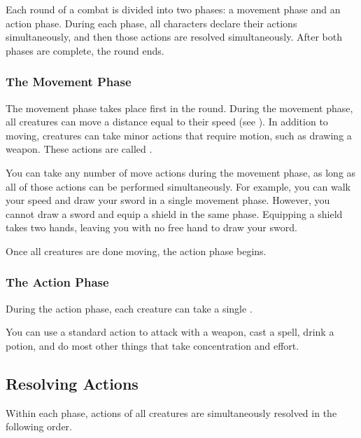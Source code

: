 Each round of a combat is divided into two phases: a movement phase and an action phase.
During each phase, all characters declare their actions simultaneously, and then those actions are resolved simultaneously.
After both phases are complete, the round ends.

\subsubsection{The Movement Phase}\label{The Movement Phase}

The movement phase takes place first in the round.
During the movement phase, all creatures can move a distance equal to their speed (see ).
In addition to moving, creatures can take minor actions that require motion, such as drawing a weapon.
These actions are called .

You can take any number of move actions during the movement phase, as long as all of those actions can be performed simultaneously.
For example, you can walk your speed and draw your sword in a single movement phase.
However, you cannot draw a sword and equip a shield in the same phase.
Equipping a shield takes two hands, leaving you with no free hand to draw your sword.

Once all creatures are done moving, the action phase begins.

\subsubsection{The Action Phase}\label{The Action Phase}

During the action phase, each creature can take a single .

 You can use a standard action to attack with a weapon, cast a spell, drink a potion, and do most other things that take concentration and effort.

\subsection{Resolving Actions}\label{Resolving Actions}

Within each phase, actions of all creatures are simultaneously resolved in the following order.

